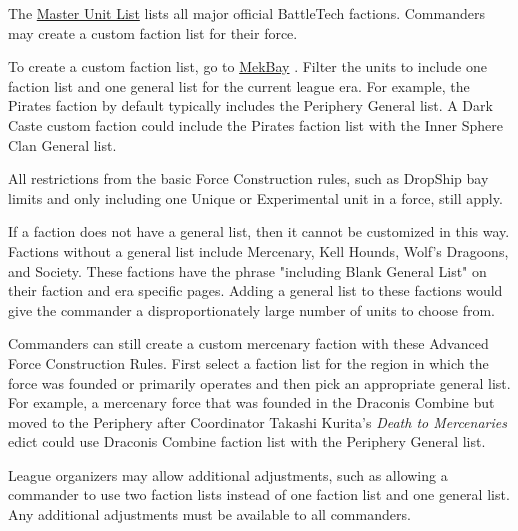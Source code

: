 The \href{http://www.masterunitlist.info/}{Master Unit List} lists all major official BattleTech factions.
Commanders may create a custom faction list for their force.

To create a custom faction list, go to \href{http://https://mekbay.com/}{MekBay} .
Filter the units to include one faction list and one general list for the current league era.
For example, the Pirates faction by default typically includes the Periphery General list.
A Dark Caste custom faction could include the Pirates faction list with the Inner Sphere Clan General list.

All restrictions from the basic Force Construction rules, such as DropShip bay limits and only including one Unique or Experimental unit in a force, still apply.

If a faction does not have a general list, then it cannot be customized in this way.
Factions without a general list include Mercenary, Kell Hounds, Wolf's Dragoons, and Society.
These factions have the phrase "including Blank General List" on their faction and era specific pages.
Adding a general list to these factions would give the commander a disproportionately large number of units to choose from.

Commanders can still create a custom mercenary faction with these Advanced Force Construction Rules.
First select a faction list for the region in which the force was founded or primarily operates and then pick an appropriate general list.
For example, a mercenary force that was founded in the Draconis Combine but moved to the Periphery after Coordinator Takashi Kurita's \emph{Death to Mercenaries} edict could use Draconis Combine faction list with the Periphery General list.

League organizers may allow additional adjustments, such as allowing a commander to use two faction lists instead of one faction list and one general list.
Any additional adjustments must be available to all commanders.
